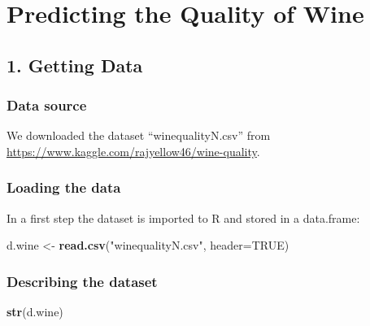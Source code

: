 \documentclass[
]{article}
\author{}
\date{\vspace{-2.5em}}
\newenvironment{Shaded}{\begin{snugshade}}{\end{snugshade}}
\newcommand{\DataTypeTok}[1]{\textcolor[rgb]{0.13,0.29,0.53}{#1}}
\newcommand{\KeywordTok}[1]{\textcolor[rgb]{0.13,0.29,0.53}{\textbf{#1}}}
\newcommand{\NormalTok}[1]{#1}
\newcommand{\OtherTok}[1]{\textcolor[rgb]{0.56,0.35,0.01}{#1}}
\newcommand{\StringTok}[1]{\textcolor[rgb]{0.31,0.60,0.02}{#1}}
\begin{document}
\hypertarget{predicting-the-quality-of-wine}{%
\section{Predicting the Quality of
Wine}\label{predicting-the-quality-of-wine}}

\hypertarget{getting-data}{%
\subsection{1. Getting Data}\label{getting-data}}

\hypertarget{data-source}{%
\subsubsection{Data source}\label{data-source}}

We downloaded the dataset ``winequalityN.csv'' from
\url{https://www.kaggle.com/rajyellow46/wine-quality}.

\hypertarget{loading-the-data}{%
\subsubsection{Loading the data}\label{loading-the-data}}

In a first step the dataset is imported to R and stored in a data.frame:

\begin{Shaded}
\begin{Highlighting}[]
\NormalTok{d.wine <-}\StringTok{ }\KeywordTok{read.csv}\NormalTok{(}\StringTok{"winequalityN.csv"}\NormalTok{, }\DataTypeTok{header=}\OtherTok{TRUE}\NormalTok{)}
\end{Highlighting}
\end{Shaded}

\hypertarget{describing-the-dataset}{%
\subsubsection{Describing the dataset}\label{describing-the-dataset}}

\begin{Shaded}
\begin{Highlighting}[]
\KeywordTok{str}\NormalTok{(d.wine)}
\end{Highlighting}
\end{Shaded}
\end{document}
